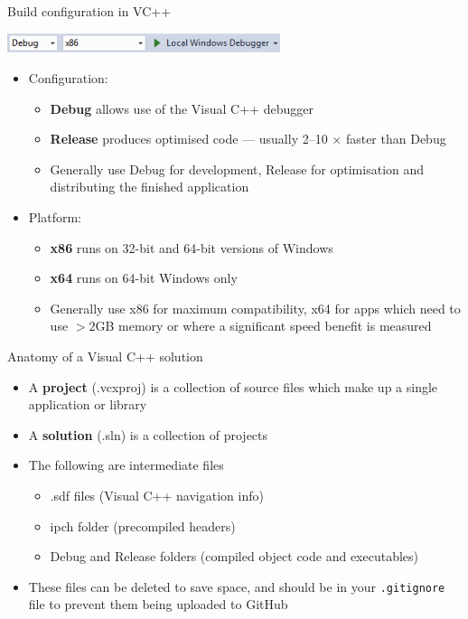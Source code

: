 \begin{frame}[fragile]{Build configuration in VC++}
    \begin{center}
        \includegraphics[width=0.6\textwidth]{vcpp_build_toolbar.PNG}
    \end{center}
     \pause
    \begin{itemize}
        \item Configuration:
        \begin{itemize}
            \item \textbf{Debug} allows use of the Visual C++ debugger \pause
            \item \textbf{Release} produces optimised code --- usually 2--10 $\times$ faster than Debug \pause
            \item Generally use Debug for development, Release for optimisation and distributing the finished application \pause
        \end{itemize}
        \item Platform:
        \begin{itemize}
            \item \textbf{x86} runs on 32-bit and 64-bit versions of Windows \pause
            \item \textbf{x64} runs on 64-bit Windows only \pause
            \item Generally use x86 for maximum compatibility, x64 for apps which need to use $>2$GB memory
                or where a significant speed benefit is measured
        \end{itemize}
    \end{itemize}
\end{frame}

\begin{frame}[fragile]{Anatomy of a Visual C++ solution}
    \begin{itemize}
        \item A \textbf{project} (.vcxproj) is a collection of source files
            which make up a single application or library \pause
        \item A \textbf{solution} (.sln) is a collection of projects \pause
        \item The following are intermediate files
        \begin{itemize}
            \item .sdf files (Visual C++ navigation info)
            \item ipch folder (precompiled headers)
            \item Debug and Release folders (compiled object code and executables) \pause
        \end{itemize}
        \item These files can be deleted to save space, and should be in your \texttt{.gitignore} file
            to prevent them being uploaded to GitHub
    \end{itemize}
\end{frame}
